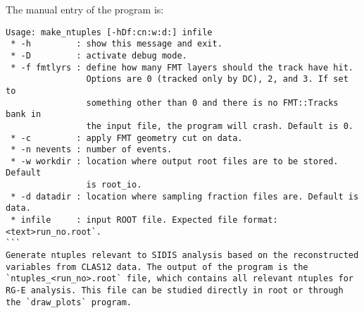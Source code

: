     The manual entry of the program is:
    \begin{lstlisting}
Usage: make_ntuples [-hDf:cn:w:d:] infile
 * -h         : show this message and exit.
 * -D         : activate debug mode.
 * -f fmtlyrs : define how many FMT layers should the track have hit.
                Options are 0 (tracked only by DC), 2, and 3. If set to
                something other than 0 and there is no FMT::Tracks bank in
                the input file, the program will crash. Default is 0.
 * -c         : apply FMT geometry cut on data.
 * -n nevents : number of events.
 * -w workdir : location where output root files are to be stored. Default
                is root_io.
 * -d datadir : location where sampling fraction files are. Default is data.
 * infile     : input ROOT file. Expected file format: <text>run_no.root`.
```
Generate ntuples relevant to SIDIS analysis based on the reconstructed variables from CLAS12 data. The output of the program is the `ntuples_<run_no>.root` file, which contains all relevant ntuples for RG-E analysis. This file can be studied directly in root or through the `draw_plots` program.
    \end{lstlisting}
